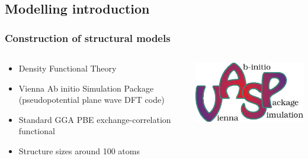 \documentclass[noamsthm,8pt,t,xcolor={dvipsnames}]{beamer}
\begin{document}
\subsection{Modelling introduction}
\begin{frame}
   \frametitle{Construction of structural models}
   \vspace{-0.3cm}
   \begin{columns}
      \begin{column}{0.8\textwidth}
         \begin{itemize}
            \item Density Functional Theory
            \item Vienna Ab initio Simulation Package (pseudopotential plane wave DFT code)
            \item Standard GGA PBE exchange-correlation functional
            \item Structure sizes around 100 atoms
         \end{itemize}
      \end{column}
      \begin{column}{0.2\textwidth}
         \begin{center}
            \includegraphics[width=0.9\linewidth]{figures/VASP.jpg}
         \end{center}
      \end{column}
   \end{columns}

   \pause


\end{frame}
\end{document}
